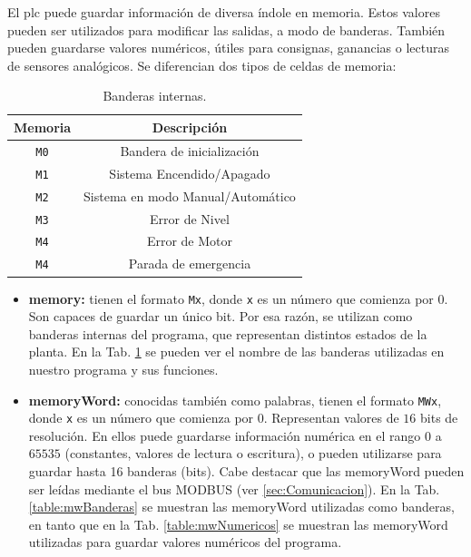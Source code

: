 El \gls{plc} puede guardar información de diversa índole en memoria.
Estos valores pueden ser utilizados para modificar las salidas, a
modo de banderas.
También pueden guardarse valores numéricos, útiles para consignas,
ganancias o lecturas de sensores analógicos.
Se diferencian dos tipos de celdas de memoria:

\begin{table}[ht]
\renewcommand{\arraystretch}{1.3}
\centering
\begin{tabular}{c||c}
\hline
\bfseries Memoria & \bfseries Descripción\\
\hline \hline
\verb|M0|  & Bandera de inicialización\\
\verb|M1|  & Sistema Encendido/Apagado\\
\verb|M2|  & Sistema en modo Manual/Automático\\
\verb|M3|  & Error de Nivel\\
\verb|M4|  & Error de Motor\\
\verb|M4|  & Parada de emergencia\\
\hline
\end{tabular}
\caption{Banderas internas.}
\label{table:Banderasinternas}
\end{table}

\begin{itemize}
 \item \textbf{\gls{memory}:} tienen el formato \verb|Mx|, donde \verb|x| es un
número que comienza por $0$.
Son capaces de guardar un único bit.
Por esa razón, se utilizan como banderas internas del programa, que representan
distintos estados de la planta.
En la Tab. \ref{table:Banderasinternas} se pueden ver el nombre
de las banderas utilizadas en nuestro programa y sus funciones.
 \item \textbf{\gls{memoryWord}:} conocidas también como palabras, tienen el
formato \verb|MWx|, donde \verb|x| es un número que comienza por $0$.
Representan valores de $16$ bits de resolución. En ellos puede guardarse
información numérica en el rango $0$ a $65535$
(constantes, valores de lectura o escritura), o pueden utilizarse para guardar
hasta 16 banderas (bits).
Cabe destacar que las \gls{memoryWord} pueden ser leídas mediante el bus MODBUS
(ver \ref{sec:Comunicacion}).
En la Tab. \ref{table:mwBanderas} se muestran las \gls{memoryWord}
utilizadas como banderas, en tanto que en la Tab.
\ref{table:mwNumericos}
se muestran las \gls{memoryWord} utilizadas para guardar valores numéricos del
programa.
\end{itemize}



